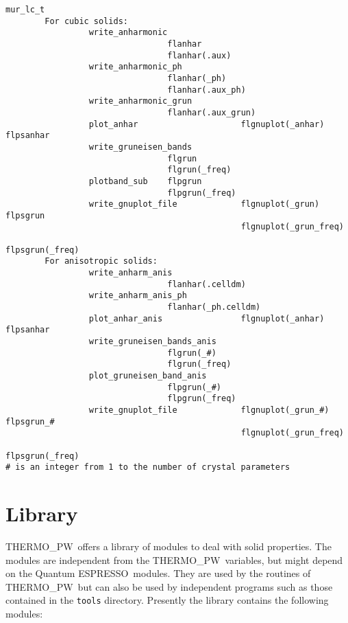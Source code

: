 \documentclass[12pt,a4paper]{article}
\def\qe{{\sc Quantum ESPRESSO}}
\def\tpw{{\sc THERMO\_PW}}
\begin{document}
\begin{verbatim}
mur_lc_t        
        For cubic solids: 
                 write_anharmonic
                                 flanhar
                                 flanhar(.aux)
                 write_anharmonic_ph
                                 flanhar(_ph)
                                 flanhar(.aux_ph)
                 write_anharmonic_grun
                                 flanhar(.aux_grun)
                 plot_anhar                     flgnuplot(_anhar)   flpsanhar
                 write_gruneisen_bands
                                 flgrun
                                 flgrun(_freq)
                 plotband_sub    flpgrun
                                 flpgrun(_freq)
                 write_gnuplot_file             flgnuplot(_grun)    flpsgrun
                                                flgnuplot(_grun_freq) 
                                                                 flpsgrun(_freq)
        For anisotropic solids:
                 write_anharm_anis
                                 flanhar(.celldm)
                 write_anharm_anis_ph
                                 flanhar(_ph.celldm)
                 plot_anhar_anis                flgnuplot(_anhar)   flpsanhar
                 write_gruneisen_bands_anis
                                 flgrun(_#)
                                 flgrun(_freq)
                 plot_gruneisen_band_anis
                                 flpgrun(_#)
                                 flpgrun(_freq)
                 write_gnuplot_file             flgnuplot(_grun_#)   flpsgrun_#
                                                flgnuplot(_grun_freq) 
                                                                 flpsgrun(_freq)
# is an integer from 1 to the number of crystal parameters
\end{verbatim} 


\newpage
\section{\color{coral}Library}

\tpw\ offers a library of modules to deal with solid properties. The 
modules are independent from the \tpw\ variables, but might
depend on the \qe\ modules. They are used by the routines of \tpw\ 
but can also be used by independent programs such as those contained
in the \texttt{tools} directory. Presently the library contains the
following modules:
\end{document}
